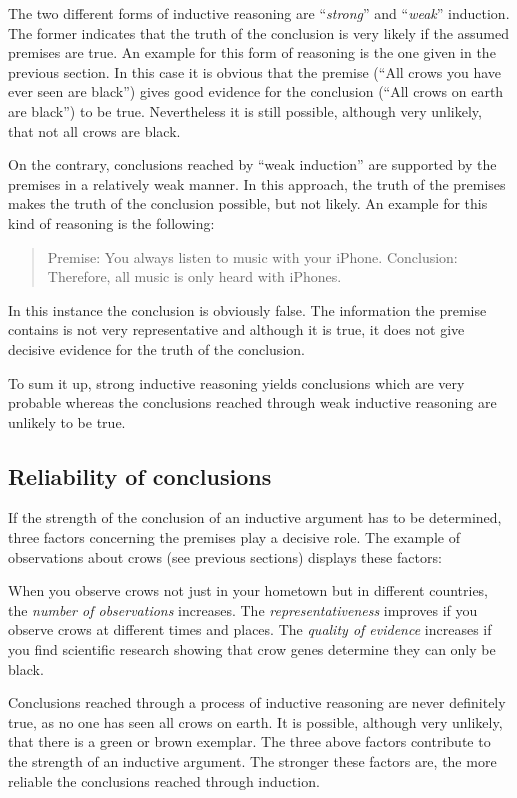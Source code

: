 \documentclass[
]{krantz}
\begin{document}
The two different forms of inductive reasoning are ``\emph{strong}'' and ``\emph{weak}'' induction. The former indicates that the truth of the conclusion is very likely if the assumed premises are true. An example for this form of reasoning is the one given in the previous section. In this case it is obvious that the premise (``All crows you have ever seen are black'') gives good evidence for the conclusion (``All crows on earth are black'') to be true. Nevertheless it is still possible, although very unlikely, that not all crows are black.

On the contrary, conclusions reached by ``weak induction'' are supported by the premises in a relatively weak manner. In this approach, the truth of the premises makes the truth of the conclusion possible, but not likely. An example for this kind of reasoning is the following:

\begin{quote}
Premise: You always listen to music with your iPhone.
Conclusion: Therefore, all music is only heard with iPhones.
\end{quote}

In this instance the conclusion is obviously false. The information the premise contains is not very representative and although it is true, it does not give decisive evidence for the truth of the conclusion.

To sum it up, strong inductive reasoning yields conclusions which are very probable whereas the conclusions reached through weak inductive reasoning are unlikely to be true.

\subsection*{Reliability of conclusions}\label{reliability-of-conclusions}


If the strength of the conclusion of an inductive argument has to be determined, three factors concerning the premises play a decisive role. The example of observations about crows (see previous sections) displays these factors:

When you observe crows not just in your hometown but in different countries, the \emph{number of observations} increases. The \emph{representativeness} improves if you observe crows at different times and places. The \emph{quality of evidence} increases if you find scientific research showing that crow genes determine they can only be black.

Conclusions reached through a process of inductive reasoning are never definitely true, as no one has seen all crows on earth. It is possible, although very unlikely, that there is a green or brown exemplar. The three above factors contribute to the strength of an inductive argument. The stronger these factors are, the more reliable the conclusions reached through induction.
\end{document}
